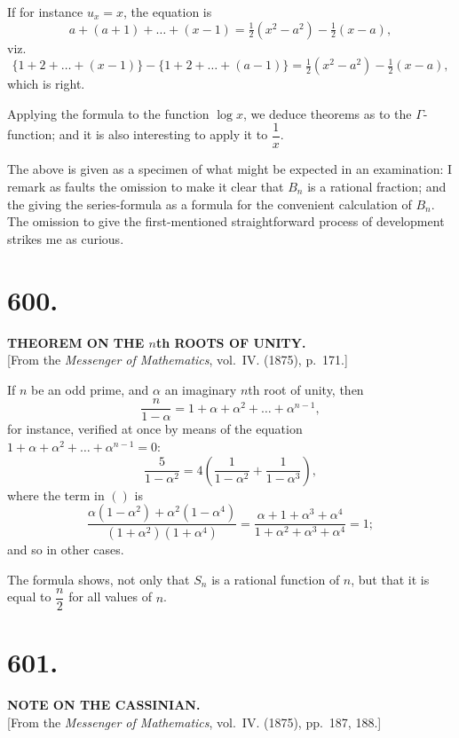 \documentclass[11pt,a4paper]{article}
\begin{document}
If for instance $u_x=x$, the equation is
\[
a+(a+1)+\ldots+(x-1) = \tfrac{1}{2}(x^2-a^2) - \tfrac{1}{2}(x-a),
\]
viz.
\[
\{1+2+\ldots+(x-1)\} - \{1+2+\ldots+(a-1)\}
= \tfrac{1}{2}(x^2-a^2) - \tfrac{1}{2}(x-a),
\]
which is right.

Applying the formula to the function $\log x$, we deduce theorems as to the
$\Gamma$-function; and it is also interesting to apply it to $\dfrac{1}{x}$.

The above is given as a specimen of what might be expected in an
examination: I remark as faults the omission to make it clear that $B_n$ is
a rational fraction; and the giving the series-formula as a formula for the
convenient calculation of $B_n$. The omission to give the first-mentioned
straightforward process of development strikes me as curious.

\newpage
\section*{600.}
\begin{center}
{\large\bfseries THEOREM ON THE $n$th ROOTS OF UNITY.}\\[0.5em]
[From the \textit{Messenger of Mathematics}, vol.~IV. (1875), p.~171.]
\end{center}

If $n$ be an odd prime, and $\alpha$ an imaginary $n$th root of unity, then
\[
\frac{n}{1-\alpha} = 1 + \alpha + \alpha^2 + \ldots + \alpha^{n-1},
\]
for instance, verified at once by means of the equation
$1+\alpha+\alpha^2+\ldots+\alpha^{n-1}=0$:
\[
\frac{5}{1-\alpha^2} = 4\left(\frac{1}{1-\alpha^2} + \frac{1}{1-\alpha^3}\right),
\]
where the term in $()$ is
\[
\frac{\alpha(1-\alpha^2)+\alpha^2(1-\alpha^4)}{(1+\alpha^2)(1+\alpha^4)}
= \frac{\alpha+1+\alpha^3+\alpha^4}{1+\alpha^2+\alpha^3+\alpha^4} = 1;
\]
and so in other cases.

The formula shows, not only that $S_n$ is a rational function of $n$, but
that it is equal to $\dfrac{n}{2}$ for all values of $n$.

\newpage
\section*{601.}
\begin{center}
{\large\bfseries NOTE ON THE CASSINIAN.}\\[0.5em]
[From the \textit{Messenger of Mathematics}, vol.~IV. (1875), pp.~187, 188.]
\end{center}
\end{document}

